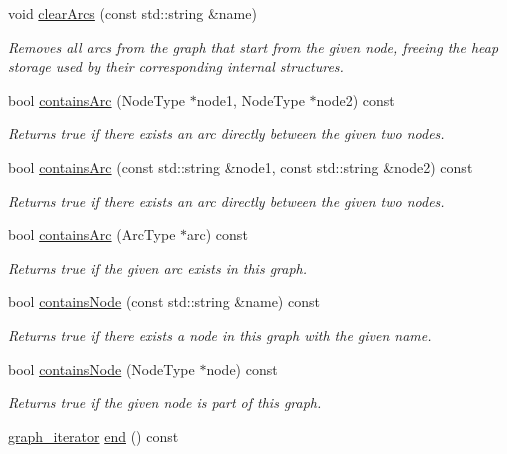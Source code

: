 \begin{DoxyCompactItemize}
void \mbox{\hyperlink{classGraph_a2d8ecb9c6768fff244b2be46319385cc}{clear\+Arcs}} (const std\+::string \&name)
\begin{DoxyCompactList}\small\item\em Removes all arcs from the graph that start from the given node, freeing the heap storage used by their corresponding internal structures. \end{DoxyCompactList}\item 
bool \mbox{\hyperlink{classGraph_a9ca50139471975b82fdc6b1977bcfa4a}{contains\+Arc}} (Node\+Type $\ast$node1, Node\+Type $\ast$node2) const
\begin{DoxyCompactList}\small\item\em Returns true if there exists an arc directly between the given two nodes. \end{DoxyCompactList}\item 
bool \mbox{\hyperlink{classGraph_a515e45aae316b581bf1cf168541f4f44}{contains\+Arc}} (const std\+::string \&node1, const std\+::string \&node2) const
\begin{DoxyCompactList}\small\item\em Returns true if there exists an arc directly between the given two nodes. \end{DoxyCompactList}\item 
bool \mbox{\hyperlink{classGraph_acf7a659ddd8a143836b91b01c200ee8a}{contains\+Arc}} (Arc\+Type $\ast$arc) const
\begin{DoxyCompactList}\small\item\em Returns true if the given arc exists in this graph. \end{DoxyCompactList}\item 
bool \mbox{\hyperlink{classGraph_ac0beb77e8a238c2898ab851df71eeefe}{contains\+Node}} (const std\+::string \&name) const
\begin{DoxyCompactList}\small\item\em Returns true if there exists a node in this graph with the given name. \end{DoxyCompactList}\item 
bool \mbox{\hyperlink{classGraph_a4f540ebc07c4e46a0bb7fee76a93386c}{contains\+Node}} (Node\+Type $\ast$node) const
\begin{DoxyCompactList}\small\item\em Returns true if the given node is part of this graph. \end{DoxyCompactList}\item 
\mbox{\hyperlink{classGraph_a695969c31e87f9e8319d74e5ca39024b}{graph\+\_\+iterator}} \mbox{\hyperlink{classGraph_afcdf62cae5d7e50644957d66f886742d}{end}} () const

\end{DoxyCompactItemize}
